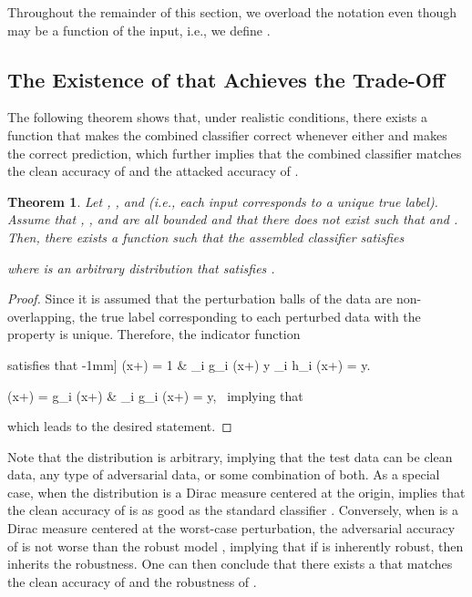 \documentclass[11pt, letterpaper]{article}
\theoremstyle{plain}
\newtheorem{theorem}{Theorem}
\theoremstyle{definition}
\begin{document}
Throughout the remainder of this section, we overload the notation  even though  may be a function of the input, i.e., we define .


\subsection{The Existence of  that Achieves the Trade-Off} \label{sec:alpha(x)}

The following theorem shows that, under realistic conditions, there exists a function  that makes the combined classifier correct whenever either  and  makes the correct prediction, which further implies that the combined classifier matches the clean accuracy of  and the attacked accuracy of .

\begin{theorem} \label{THM:ADA}
    Let , , and  (i.e., each input corresponds to a unique true label). Assume that , , and  are all bounded and that there does not exist  such that  and . Then, there exists a function  such that the assembled classifier  satisfies
    
    where  is an arbitrary distribution that satisfies .
\end{theorem}

\begin{proof}
Since it is assumed that the perturbation balls of the data are non-overlapping, the true label  corresponding to each perturbed data  with the property  is unique. Therefore, the indicator function

satisfies that
-1mm]
    \alpha (x+\delta) = 1 \quad\;\; &  \quad\; \argmax_{i \in [c]} g_i (x+\delta) \neq y  \argmax_{i \in [c]} h_i (x+\delta) = y.

    \hialpha (x+\delta) = g_i (x+\delta) \quad\; &  \quad\; \argmax_{i \in [c]} g_i (x+\delta) = y, \
implying that 

which leads to the desired statement.	
\end{proof}

Note that the distribution  is arbitrary, implying that the test data can be clean data, any type of adversarial data, or some combination of both. As a special case, when the distribution  is a Dirac measure centered at the origin,  implies that the clean accuracy of  is as good as the standard classifier . Conversely, when  is a Dirac measure centered at the worst-case perturbation, the adversarial accuracy of  is not worse than the robust model , implying that if  is inherently robust, then  inherits the robustness. One can then conclude that there exists a  that matches the clean accuracy of  and the robustness of .
\end{document}
